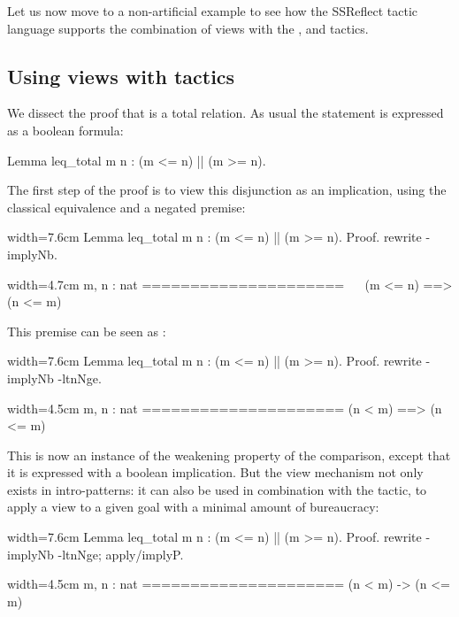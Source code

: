 Let us now move to a non-artificial example to see how the SSReflect
tactic language supports the combination of views with the ,
 and  tactics.

\subsection{Using views with tactics}\label{sec:viewtac}

We dissect the proof that \C{<=} is a total relation.
As usual the statement is expressed as a boolean formula:

\begin{coq}{}{}
Lemma leq_total m n : (m <= n) || (m >= n).
\end{coq}

The first step of the proof is to view this disjunction as an
implication, using the classical equivalence and a negated premise:

\begin{coq}{}{width=7.6cm}
Lemma leq_total m n : (m <= n) || (m >= n).
Proof.
rewrite -implyNb.
\end{coq}
\begin{coqout}{}{width=4.7cm}
m, n : nat
=====================
~~ (m <= n) ==> (n <= m)
\end{coqout}

This premise can be seen as :

\begin{coq}{}{width=7.6cm}
Lemma leq_total m n : (m <= n) || (m >= n).
Proof.
rewrite -implyNb -ltnNge.
\end{coq}
\begin{coqout}{}{width=4.5cm}
m, n : nat
=====================
(n < m) ==> (n <= m)
\end{coqout}

This is now an instance of the weakening property of the comparison,
except that it is expressed with a boolean implication. But the view
mechanism not only exists in intro-patterns: it can also be used in
combination with the  tactic, to apply a view to a given goal
with a minimal amount of bureaucracy:

\begin{coq}{}{width=7.6cm}
Lemma leq_total m n : (m <= n) || (m >= n).
Proof.
rewrite -implyNb -ltnNge; apply/implyP.
\end{coq}
\begin{coqout}{}{width=4.5cm}
m, n : nat
=====================
(n < m) -> (n <= m)
\end{coqout}


